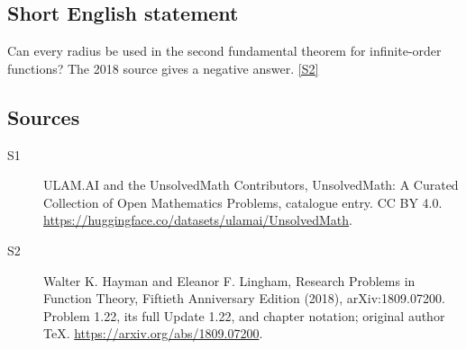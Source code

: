 \documentclass[11pt]{article}
\newcommand{\sref}[2]{\hyperlink{source:#1:#2}{[S#2]}}
\begin{document}
\subsection{Short English statement}
Can every radius be used in the second fundamental theorem for infinite-order functions? The 2018 source gives a negative answer. \sref{statement}{2}
\subsection{Sources}
\begin{description}
\item[\hypertarget{source:statement:1}{S1}] ULAM.AI and the UnsolvedMath Contributors, UnsolvedMath: A Curated Collection of Open Mathematics Problems, catalogue entry. CC BY 4.0. \url{https://huggingface.co/datasets/ulamai/UnsolvedMath}.
\item[\hypertarget{source:statement:2}{S2}] Walter K. Hayman and Eleanor F. Lingham, Research Problems in Function Theory, Fiftieth Anniversary Edition (2018), arXiv:1809.07200. Problem 1.22, its full Update 1.22, and chapter notation; original author TeX. \url{https://arxiv.org/abs/1809.07200}.
\end{description}
\label{end:statement}
\end{document}
